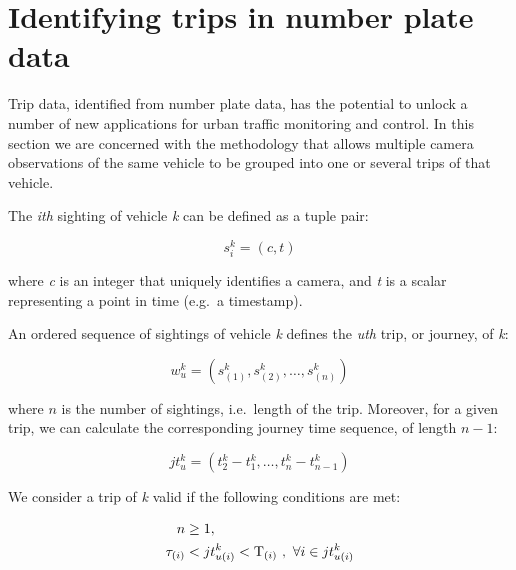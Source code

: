 \section{Identifying trips in number plate data}

Trip data, identified from number plate data, has the potential to unlock a number of new applications for urban traffic monitoring and control. In this section we are concerned with the methodology that allows multiple camera observations of the same vehicle to be grouped into one or several trips of that vehicle.

The \emph{ith} sighting of vehicle \emph{k} can be defined as a tuple pair:

\begin{equation} \label{e.sighting}
s^{k}_{i} = \left(c, t\right)
\end{equation}

where \emph{c} is an integer that uniquely identifies a camera, and \emph{t} is a scalar representing a point in time (e.g.\ a timestamp).

An ordered sequence of sightings of vehicle \emph{k} defines the \emph{uth} trip, or journey, of \emph{k}:

\begin{equation} \label{e.trip}
w^{k}_{u} = \left(s^{k}_{(1)}, s^{k}_{(2)}, \dots , s^{k}_{(n)}\right)
\end{equation}

where \( n \) is the number of sightings, i.e.\ length of the trip. Moreover, for a given trip, we can calculate the corresponding journey time sequence, of length \(n-1\):

\begin{equation} \label{e.journeytime}
jt^{k}_{u} = \left(t^{k}_{2} - t^{k}_{1}, \ldots, t^{k}_{n} - t^{k}_{n-1} \right)
\end{equation}

We consider a trip of \emph{k} valid if the following conditions are met:

\begin{align}
n &\ge 1 , \label{e.trip.constraints.1} \\
\tau_{(i)} &< jt^{k}_{u(i)} < \mathrm{T}_{(i)} \ , \ \forall i \in jt^{k}_{u(i)} \label{e.trip.constraints.2}
\end{align}

